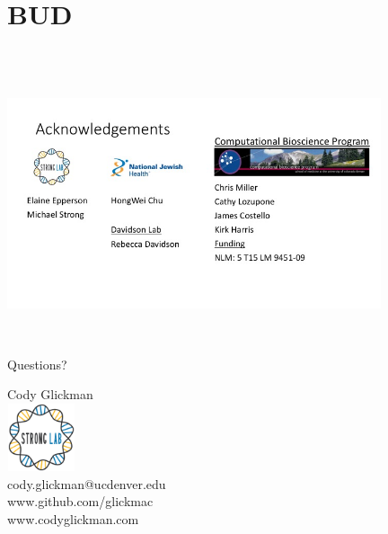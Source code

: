 \documentclass[11pt]{beamer}
\begin{document}
	

	
	

	

	
	

\section{BUD}
\subsection{}
	

	

	
\section{}
	
	\begin{frame}{}
	\vspace{1cm}
	{\includegraphics[height=8cm, width=11cm]{Acknowledge.jpg} }
	\end{frame}
	
	
	\begin{frame}{Questions?}
	
	Cody Glickman \\ \includegraphics[height=2cm, width=2cm]{lablogo.png} \\ cody.glickman@ucdenver.edu \\ \alert{www.github.com/glickmac} \\ www.codyglickman.com
	\end{frame}
	
\end{document}
